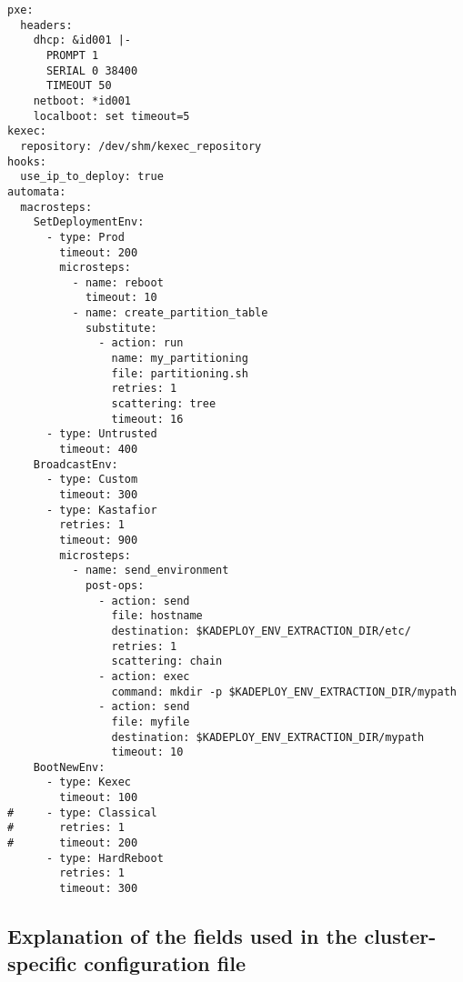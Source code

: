 \documentclass[a4wide,10pt,oneside]{book}
\begin{document}
\begin{small}
\begin{verbatim}
pxe:
  headers:
    dhcp: &id001 |-
      PROMPT 1
      SERIAL 0 38400
      TIMEOUT 50
    netboot: *id001
    localboot: set timeout=5
kexec:
  repository: /dev/shm/kexec_repository
hooks:
  use_ip_to_deploy: true
automata:
  macrosteps:
    SetDeploymentEnv:
      - type: Prod
        timeout: 200
        microsteps:
          - name: reboot
            timeout: 10
          - name: create_partition_table
            substitute:
              - action: run
                name: my_partitioning
                file: partitioning.sh
                retries: 1
                scattering: tree
                timeout: 16
      - type: Untrusted
        timeout: 400
    BroadcastEnv:
      - type: Custom
        timeout: 300
      - type: Kastafior
        retries: 1
        timeout: 900
        microsteps:
          - name: send_environment
            post-ops:
              - action: send
                file: hostname
                destination: $KADEPLOY_ENV_EXTRACTION_DIR/etc/
                retries: 1
                scattering: chain
              - action: exec
                command: mkdir -p $KADEPLOY_ENV_EXTRACTION_DIR/mypath
              - action: send
                file: myfile
                destination: $KADEPLOY_ENV_EXTRACTION_DIR/mypath
                timeout: 10
    BootNewEnv:
      - type: Kexec
        timeout: 100
#     - type: Classical
#       retries: 1
#       timeout: 200
      - type: HardReboot
        retries: 1
        timeout: 300
\end{verbatim}
\end{small}

\subsection{Explanation of the fields used in the cluster-specific configuration file\label{sec:specific_config}}
\end{document}
